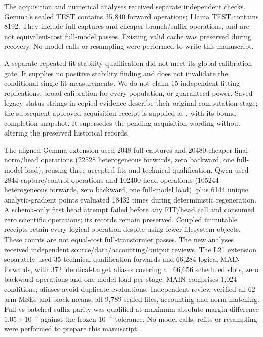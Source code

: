 The acquisition and numerical analyses received separate independent checks. Gemma's sealed TEST contains 35,840 forward operations; Llama TEST contains 8192. They include full captures and cheaper branch/suffix operations, and are not equivalent-cost full-model passes. Existing valid cache was preserved during recovery. No model calls or resampling were performed to write this manuscript.

A separate repeated-fit stability qualification did not meet its global calibration gate. It supplies no positive stability finding and does not invalidate the conditional single-fit measurements. We do not claim 15 independent fitting replications, broad calibration for every population, or guaranteed power. Saved legacy status strings in copied evidence describe their original computation stage; the subsequent approved acquisition receipt is supplied as , with its bound completion snapshot. It supersedes the pending acquisition wording without altering the preserved historical records.

The aligned Gemma extension used 2048 full captures and 20480 cheaper final-norm/head operations (22528 heterogeneous forwards, zero backward, one full-model load), reusing three accepted fits and technical qualification. Qwen used 2844 capture/control operations and 102400 head operations (105244 heterogeneous forwards, zero backward, one full-model load), plus 6144 unique analytic-gradient points evaluated 18432 times during deterministic regeneration. A schema-only first head attempt failed before any FIT/head call and consumed zero scientific operations; its records remain preserved. Coupled immutable receipts retain every logical operation despite using fewer filesystem objects. These counts are not equal-cost full-transformer passes. The new analyses received independent source/data/accounting/output reviews. The L21 extension separately used 35 technical qualification forwards and 66,284 logical MAIN forwards, with 372 identical-target aliases covering all 66,656 scheduled slots, zero backward operations and one model load per stage. MAIN comprises 1,024 conditions; aliases avoid duplicate evaluations. Independent review verified all 62 arm MSEs and block means, all 9,789 sealed files, accounting and norm matching. Full-vs-batched suffix parity was qualified at maximum absolute margin difference $1.05\times10^{-5}$ against the frozen $10^{-4}$ tolerance. No model calls, refits or resampling were performed to prepare this manuscript.


